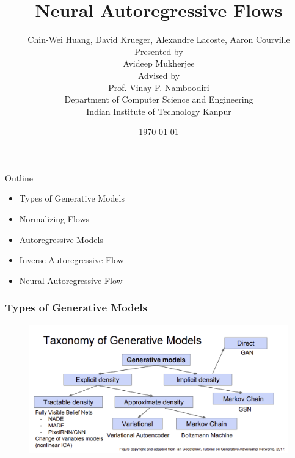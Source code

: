 \documentclass{beamer}
\title[]{Neural Autoregressive Flows} %
\author[]{Chin-Wei Huang, David Krueger, Alexandre Lacoste, Aaron Courville \\[1cm]Presented by\\[.8em]{\large Avideep Mukherjee}\\Advised by\\{\large Prof. Vinay P. Namboodiri} \\[1em] {\footnotesize Department of Computer Science and Engineering\\ Indian Institute of Technology Kanpur}} %
\institute[] %
\date{\today} %
\begin{document}
\begin{frame}
\titlepage %
\end{frame}

\begin{frame}{Outline}
    \begin{itemize}
        \item Types of Generative Models
        \item Normalizing Flows
        \item Autoregressive Models
        \item Inverse Autoregressive Flow
        \item Neural Autoregressive Flow
    \end{itemize}
\end{frame}
\begin{frame}
\frametitle{Types of Generative Models} %
 
\begin{figure}[h]
    \centering
    \includegraphics[width=\textwidth,keepaspectratio]{generative-models.png}
    \label{fig:my_label}
\end{figure}




\end{frame}
\end{document}
